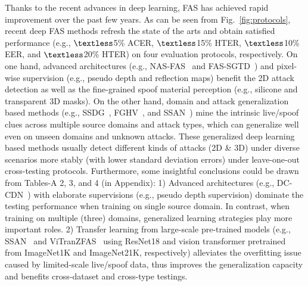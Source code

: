 \documentclass[10pt,journal,compsoc]{IEEEtran}
\begin{document}
Thanks to the recent advances in deep learning, FAS has achieved rapid improvement over the past few years. As can be seen from Fig.~\ref{fig:protocols}, recent deep FAS methods refresh the state of the arts and obtain satisfied performance (e.g., $\textless$5\% ACER, $\textless$15\% HTER, $\textless$10\% EER, and $\textless$20\% HTER) on four evaluation protocols, respectively. On one hand, advanced architectures (e.g., NAS-FAS~\cite{yu2020fas2} and FAS-SGTD~\cite{wang2020deep}) and pixel-wise supervision (e.g., pseudo depth and reflection maps) benefit the 2D attack detection as well as the fine-grained spoof material perception (e.g., silicone and transparent 3D masks). On the other hand, domain and attack generalization based methods (e.g., SSDG~\cite{jia2020single}, FGHV~\cite{liu2022feature}, and SSAN~\cite{wang2022domain}) mine the intrinsic live/spoof clues across multiple source domains and attack types, which can generalize well even on unseen domains and unknown attacks. These generalized deep learning based methods usually detect different kinds of attacks (2D \& 3D) under diverse scenarios more stably (with lower standard deviation errors) under leave-one-out cross-testing protocols. Furthermore, some insightful conclusions could be drawn from Tables-A 2, 3, and 4 (in Appendix): 1) Advanced architectures (e.g., DC-CDN~\cite{yu2021dual}) with elaborate supervisions (e.g., pseudo depth supervision) dominate the testing performance when training on single source domain. In contrast, when training on multiple (three) domains, generalized learning strategies play more important roles. 2) Transfer learning from large-scale pre-trained models (e.g., SSAN~\cite{wang2022domain} and ViTranZFAS~\cite{liu2019deep} using ResNet18 and vision transformer pretrained from ImageNet1K and ImageNet21K, respectively) alleviates the overfitting issue caused by limited-scale live/spoof data, thus improves the generalization capacity and benefits cross-dataset and cross-type testings.
\end{document}
